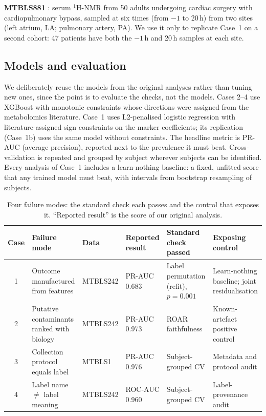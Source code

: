 \documentclass[conference]{IEEEtran}
\begin{document}
\textbf{MTBLS881} \cite{maltesen2020}: serum $^1$H-NMR from 50 adults
undergoing cardiac surgery with cardiopulmonary bypass, sampled at six times
(from $-1$ to 20\,h) from two sites (left atrium, LA; pulmonary artery, PA).
We use it only to replicate Case~1 on a second cohort: 47 patients have both
the $-1$\,h and 20\,h samples at each site.

\subsection{Models and evaluation}
We deliberately reuse the models from the original analyses rather than
tuning new ones, since the point is to evaluate the checks, not the models.
Cases 2--4 use XGBoost \cite{chen2016} with monotonic constraints whose
directions were assigned from the metabolomics literature. Case~1 uses
L2-penalised logistic regression with literature-assigned sign constraints
on the marker coefficients; its replication (Case~1b) uses the same model
without constraints. The headline metric is PR-AUC (average precision),
reported next to the prevalence it must beat. Cross-validation is repeated
and grouped by subject wherever subjects can be identified. Every analysis of
Case~1 includes a learn-nothing baseline: a fixed, unfitted score that any
trained model must beat, with intervals from bootstrap resampling of
subjects.

\begin{table}[t]
\centering
\caption{Four failure modes: the standard check each passes and the control
that exposes it. ``Reported result'' is the score of our original analysis.}
\label{tab:taxonomy}
\footnotesize
\begin{tabular}{@{}c p{3.4cm} l l p{3.2cm} p{3.2cm}@{}}
\toprule
Case & Failure mode & Data & Reported result & Standard check passed & Exposing control \\
\midrule
1 & Outcome manufactured from features & MTBLS242 & PR-AUC 0.683 & Label permutation (refit), $p=0.001$ & Learn-nothing baseline; joint residualisation \\
2 & Putative contaminants ranked with biology & MTBLS242 & PR-AUC 0.973 & ROAR faithfulness & Known-artefact positive control \\
3 & Collection protocol equals label & MTBLS1 & PR-AUC 0.976 & Subject-grouped CV & Metadata and protocol audit \\
4 & Label name $\neq$ label meaning & MTBLS242 & ROC-AUC 0.960 & Subject-grouped CV & Label-provenance audit \\
\bottomrule
\end{tabular}
\end{table}
\end{document}

